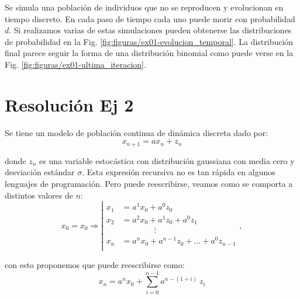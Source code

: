 \documentclass[twocolumn,aps,prl]{revtex4-1}
\begin{document}
Se simula una población de individuos que no se reproducen y evolucionan en tiempo discreto. En cada paso de tiempo cada uno puede morir con probabilidad $d$. Si realizamos varias de estas simulaciones pueden obtenerse las distribuciones de probabilidad en la Fig. \ref{fig:figuras/ex01-evolucion_temporal}. La distribución final parece seguir la forma de una distribución binomial como puede verse en la Fig. \ref{fig:figuras/ex01-ultima_iteracion}.

\section{Resolución Ej 2}

Se tiene un modelo de población continua de dinámica discreta dado por:
\begin{equation}\label{ec:map01}
  x_{n+1} = a x_n + z_n
\end{equation}

donde $z_n$ es una variable estocástica con distribución gaussiana con media cero y desviación estándar $\sigma$. Esta expresión recursiva no es tan rápida en algunos lenguajes de programación. Pero puede reescribirse, veamos como se comporta a distintos valores de $n$:
\begin{equation}\label{ec:map01-evaluations}
  x_0 = x_0 \Rightarrow
  \left\vert\begin{aligned}
    x_1 &= a^1 x_0 + a^0 z_0 \\
    x_2 &= a^2 x_0 + a^1 z_0 + a^0 z_1 \\
        & \qquad \qquad \vdots \\
    x_n &= a^n x_0 + a^{n-1} z_0 + \ldots + a^0 z_{n-1}\\
  \end{aligned}\right. , 
\end{equation}

con esto proponemos que puede reescribirse como:
\begin{equation}\label{ec:map01-r}
  x_n = a^{n} x_0 + \sum_{i=0}^{n-1} a^{n-(1+i)} \ z_i
\end{equation}
\end{document}
